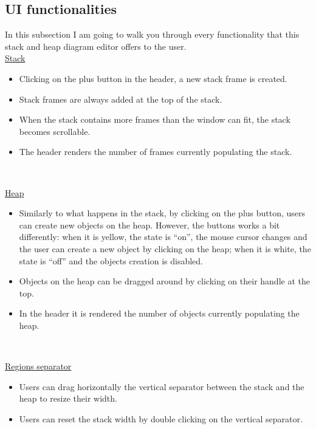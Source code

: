 \documentclass[]{usiinfbachelorproject}
\begin{document}
\vspace{\fill}
\pagebreak

\subsection{UI functionalities}

In this subsection I am going to walk you through every functionality that this stack and heap diagram editor offers to the user.\\

\ul{Stack}

\begin{itemize}
	\item Clicking on the plus button in the header, a new stack frame is created.
	\item Stack frames are always added at the top of the stack.
	\item When the stack contains more frames than the window can fit, the stack becomes scrollable. 
	\item The header renders the number of frames currently populating the stack.
\end{itemize}\

\ul{Heap}

\begin{itemize}
	\item Similarly to what happens in the stack, by clicking on the plus button, users can create new objects on the heap. However, the buttons works a bit differently: when it is yellow, the state is ``on'', the mouse cursor changes and the user can create a new object by clicking on the heap; when it is white, the state is ``off'' and the objects creation is disabled.
	\item Objects on the heap can be dragged around by clicking on their handle at the top.
	\item In the header it is rendered the number of objects currently populating the heap.
\end{itemize}\

\ul{Regions separator}

\begin{itemize}
	\item Users can drag horizontally the vertical separator between the stack and the heap to resize their width.
	\item Users can reset the stack width by double clicking on the vertical separator.
\end{itemize}\
\end{document}
